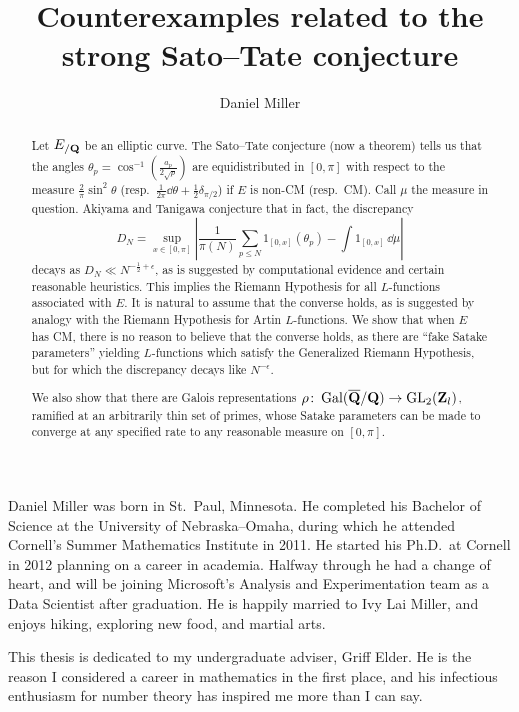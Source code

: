 \documentclass[phd,cornellheadings,tocprelim]{cornell}
\title{Counterexamples related to the strong Sato--Tate conjecture}
\author{Daniel Miller}
\begin{document}
\maketitle
\makecopyright

\begin{abstract}
Let $E_{/\mathbf{Q}}$ be an elliptic curve. The Sato--Tate conjecture (now a theorem) 
tells us that the angles $\theta_p =\cos^{-1}\left(\frac{a_p}{2\sqrt p}\right)$ 
are equidistributed in $[0,\pi]$ with respect to the measure 
$\frac{2}{\pi}\sin^2\theta$ 
(resp.~$\frac{1}{2\pi} \dd \theta + \frac 1 2 \delta_{\pi/2}$) if $E$ is non-CM 
(resp.~CM). Call $\mu$ the measure in question. Akiyama and Tanigawa conjecture 
that in fact, the discrepancy 
\[
	D_N = \sup_{x\in [0,\pi]} \left| \frac{1}{\pi(N)} \sum_{p\leqslant N} 1_{[0,x]}(\theta_p) - \int 1_{[0,x]} \, \dd\mu\right| 
\]
decays as $D_N \ll N^{-\frac 1 2+\epsilon}$, as is suggested by computational 
evidence and certain reasonable heuristics. This implies the Riemann Hypothesis 
for all $L$-functions associated with $E$. It is natural to assume that the 
converse holds, as is suggested by analogy with the Riemann Hypothesis for 
Artin $L$-functions. We show that when $E$ has CM, there is no 
reason to believe that the converse holds, as there are ``fake Satake 
parameters'' yielding $L$-functions which satisfy the Generalized Riemann 
Hypothesis, but for which the discrepancy decays like $N^{-\epsilon}$. 

We also show that there are Galois representations 
$\rho\colon \operatorname{Gal}(\overline {\mathbf{Q}} /\mathbf{Q}) \to \operatorname{GL}_2(\mathbf{Z}_l)$, ramified at an 
arbitrarily thin set of primes, whose Satake parameters can be made to 
converge at any specified rate to any reasonable measure on $[0,\pi]$. 
\end{abstract}

\begin{biosketch}
Daniel Miller was born in St.~Paul, Minnesota. He completed his Bachelor of 
Science at the University of Nebraska--Omaha, during which he attended 
Cornell's Summer Mathematics Institute in 2011. He started his Ph.D.~at 
Cornell in 2012 planning on a career in academia. Halfway through he had a 
change of heart, and will be joining Microsoft's Analysis and Experimentation 
team as a Data Scientist after graduation. He is happily married to Ivy 
Lai Miller, and enjoys hiking, exploring new food, and martial arts. 
\end{biosketch}

\begin{dedication}
This thesis is dedicated to my undergraduate adviser, Griff Elder. 
He is the reason I considered a career in mathematics in the first place, and 
his infectious enthusiasm for number theory has inspired me more than I can 
say. 
\end{dedication}
\end{document}
